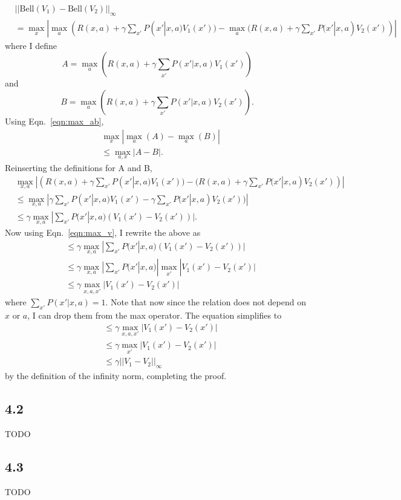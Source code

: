 \documentclass[12pt]{amsart}
\begin{document}
\begin{equation}
\begin{split}
& ||\text{Bell}(V_1) - \text{Bell}(V_2)||_{\infty} \\
& = \max_{x} | \max_a (R(x,a) + \gamma \sum_{x'}P(x'|x,a)V_1(x')) - \max_a (R(x,a) + \gamma \sum_{x'}P(x'|x,a)V_2(x'))|
\end{split}
\end{equation}
where I define 
\begin{equation}
A = \max_a (R(x,a) + \gamma \sum_{x'}P(x'|x,a)V_1(x'))
\end{equation}
and 
\begin{equation}
B = \max_a (R(x,a) + \gamma \sum_{x'}P(x'|x,a)V_2(x')).
\end{equation}
Using Eqn.~\ref{eqn:max_ab},
\begin{equation}
\begin{split}
& \max_x | \max_a(A) - \max_a(B) | \\
& \leq \max_{a,x} |A - B|.
\end{split}
\end{equation}
Reinserting the definitions for A and B,
\begin{equation}
\begin{split}
&\max_{x,a} |(R(x,a) + \gamma \sum_{x'}P(x'|x,a)V_1(x')) - (R(x,a) + \gamma \sum_{x'}P(x'|x,a)V_2(x'))| \\
&\leq \max_{x,a} | \gamma \sum_{x'}P(x'|x,a)V_1(x') - \gamma \sum_{x'}P(x'|x,a)V_2(x'))| \\
& \leq  \gamma \max_{x,a} |\sum_{x'}P(x'|x,a)(V_1(x') - V_2(x'))|.
\end{split}
\end{equation}
Now using Eqn.~\ref{eqn:max_v}, I rewrite the above as
\begin{equation}
\begin{split}
& \leq  \gamma \max_{x,a} |\sum_{x'}P(x'|x,a)(V_1(x') - V_2(x'))| \\
& \leq \gamma \max_{x,a} |\sum_{x'}P(x'|x,a)| \max_{x'}|V_1(x') - V_2(x')| \\
& \leq \gamma \max_{x,a,x'}|V_1(x') - V_2(x')|
\end{split}
\end{equation}
where $\sum_{x'}P(x'|x,a) = 1$.  Note that now since the relation does not depend on $x$ or $a$, I can drop them from the max operator.  The equation simplifies to 
\begin{equation}
\begin{split}
& \leq \gamma \max_{x,a,x'}|V_1(x') - V_2(x')| \\
& \leq \gamma \max_{x'}|V_1(x') - V_2(x')| \\
& \leq \gamma ||V_1 - V_2||_{\infty}
\end{split}
\end{equation}
by the definition of the infinity norm, completing the proof.

\subsection*{4.2}
TODO

\subsection*{4.3}
TODO
\end{document}

